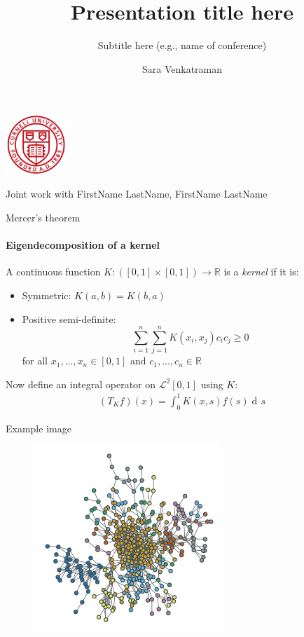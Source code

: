 \documentclass[dvipsnames, handout]{beamer}
\newcommand{\R}{\mathbb{R}}	%
\newcommand{\El}{\mathcal{L}}	%
\newcommand{\1}{\mathds{1}}	%
\DeclareMathOperator*{\dv}{d\!}		%
\begin{document}

\title{\color{titleText}Presentation title here}
\subtitle{\color{Blue}Subtitle here (e.g., name of conference)}
\author{Sara Venkatraman\vspace{-.3cm}}
\date{}

\begin{frame}
\titlepage
\vspace{-1.2cm}
\begin{center}
\includegraphics[width=2.3cm]{Cornell}\bigskip
{\begin{spacing}{1.2}\scriptsize 
Joint work with FirstName LastName, FirstName LastName
\end{spacing}}
\end{center}
\end{frame}


\begin{frame}{Mercer's theorem}
\framesubtitle{Eigendecomposition of a kernel}
A continuous function $K:([0,1]\times[0,1])\to\R$ is a \textit{kernel} if it is: \vspace{-0.4em}
\pause
\begin{itemize}
\item Symmetric: $K(a,b)=K(b,a)$\pause
\item Positive semi-definite: $$\sum_{i=1}^n\sum_{j=1}^nK(x_i,x_j)c_ic_j\geq 0$$ for all $ x_1,...,x_n\in[0,1]$ and $c_1,...,c_n\in\R$
\end{itemize}
\pause 
Now define an integral operator on $\El^2[0,1]$ using $K$:
\begin{align*}
(T_Kf)(x) = \int_0^1K(x,s)f(s)\dv s
\end{align*}
\end{frame}

\begin{frame}{Example image}
\begin{figure}[H]
\centering\includegraphics[width=7cm]{ExampleImage}	
\end{figure}
\end{frame}
\end{document}
